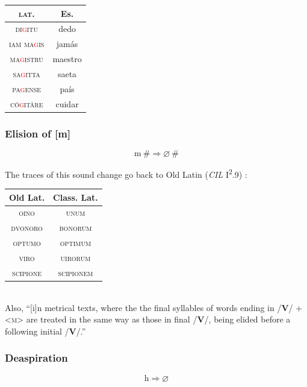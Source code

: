 \documentclass{report}[12pt]
\begin{document}
\begin{tabular}{c c}
  \textsc{lat.} & Es. \\
  \hline
  \textsc{di\textcolor{red}{g}itu} & dedo \\
  \textsc{iam ma\textcolor{red}{g}is} & jamás \\
  \textsc{ma\textcolor{red}{g}istru} & maestro \\
  \textsc{sa\textcolor{red}{g}itta} & saeta \\
  \textsc{pa\textcolor{red}{g}ense} & país \\
  \textsc{c\={o}\textcolor{red}{g}it\={a}re} & cuidar \\
\end{tabular}

\subsubsection{Elision of [m]}\label{sec:m_elision}

\begin{tcolorbox}
  \[ \text{m}\ \# \Rightarrow \varnothing\ \# \]
\end{tcolorbox}

The traces of this sound change go back to Old Latin (\emph{CIL} I\textsuperscript{2}.9) \parencite[p.~17]{companion_to_latin}: \\
\begin{tabular}{c c}
  Old Lat. & Class. Lat. \\
  \hline
  \textsc{oino} & \textsc{unum} \\
  \textsc{dvonoro} & \textsc{bonorum} \\
  \textsc{optumo} & \textsc{optimum} \\
  \textsc{viro} & \textsc{uirorum} \\
  \textsc{scipione} & \textsc{scipionem} \\
\end{tabular} \\
Also, ``[i]n metrical texts, where the the final syllables of words ending in /\textbf{V}/ $+$ <\textsc{m}> are treated in the same way as those in final /\textbf{V}/, being elided before a following initial /\textbf{V}/.'' \parencite[p.~87]{companion_to_latin}

\subsubsection{Deaspiration}

\begin{tcolorbox}
  \[ \text{h} \Rightarrow \varnothing \]
\end{tcolorbox}
\end{document}

